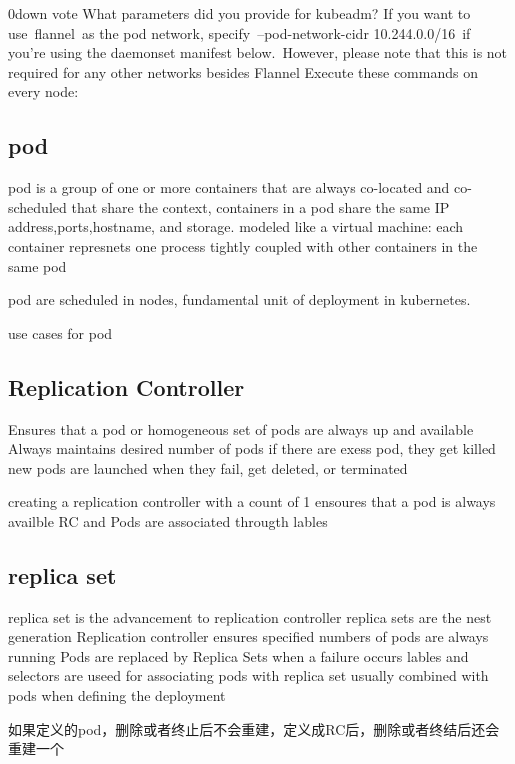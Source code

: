 0down vote	What parameters did you provide for kubeadm?
	If you want to use flannel as the pod network, specify --pod-network-cidr 10.244.0.0/16 if you’re using the daemonset manifest below. However, please note that this is not required for any other networks besides Flannel
	Execute these commands on every node:





\subsection{ pod}

pod is a group of one or more containers that are always co-located and
co-scheduled that share the context, containers in a pod share the same
IP address,ports,hostname, and storage. modeled like a virtual machine:
each container represnets one process
tightly coupled with other containers in the same pod

pod are scheduled in nodes, fundamental unit of deployment in kubernetes.

use cases for pod



\subsection{Replication Controller}

Ensures that a pod or homogeneous set of pods are always up and available
Always maintains desired number of pods
if there are exess pod, they get killed
new pods are launched when they fail, get deleted, or terminated

creating a replication controller with a count of 1 ensoures that a pod 
is always availble
RC and Pods are associated througth lables

\subsection{replica set}

replica set is the advancement to replication controller
replica sets are the nest generation Replication controller
ensures specified numbers of pods are always running
Pods are replaced by Replica Sets when a failure occurs
lables and selectors are useed for associating pods with replica set
usually combined with pods when defining the deployment


如果定义的pod，删除或者终止后不会重建，定义成RC后，删除或者终结后还会重建一个

